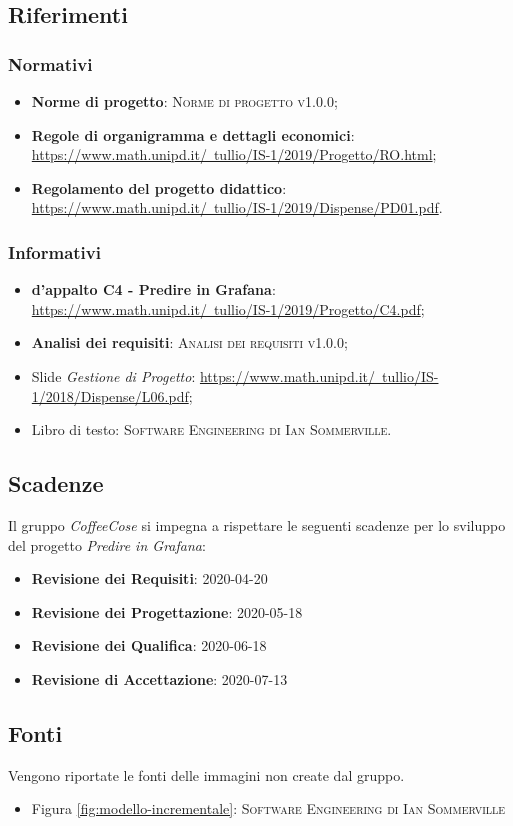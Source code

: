 \documentclass[../piano-di-progetto.tex]{subfiles}
\begin{document}
\subsection{Riferimenti}
\subsubsection{Normativi}
\begin{itemize}
  \item \textbf{Norme di progetto}: \textsc{Norme di progetto v1.0.0};
  \item \textbf{Regole di organigramma e dettagli economici}: \href{https://www.math.unipd.it/~tullio/IS-1/2019/Progetto/RO.html}{https://www.math.unipd.it/~tullio/IS-1/2019/Progetto/RO.html};
  \item \textbf{Regolamento del progetto didattico}: \href{https://www.math.unipd.it/~tullio/IS-1/2019/Dispense/PD01.pdf}{https://www.math.unipd.it/~tullio/IS-1/2019/Dispense/PD01.pdf}.
\end{itemize}

\subsubsection{Informativi}
\begin{itemize}
  \item \textbf{ d’appalto C4 - Predire in Grafana}: \href{https://www.math.unipd.it/~tullio/IS-1/2019/Progetto/C4.pdf}{https://www.math.unipd.it/~tullio/IS-1/2019/Progetto/C4.pdf};
  \item \textbf{Analisi dei requisiti}: \textsc{Analisi dei requisiti v1.0.0};
  \item Slide \emph{Gestione di Progetto}: \href{https://www.math.unipd.it/~tullio/IS-1/2018/Dispense/L06.pdf}{https://www.math.unipd.it/~tullio/IS-1/2018/Dispense/L06.pdf};
  \item Libro di testo: \textsc{Software Engineering di Ian Sommerville}.
\end{itemize}

\subsection{Scadenze}
\label{scadenze}
Il gruppo \emph{CoffeeCose} si impegna a rispettare le seguenti scadenze per lo sviluppo del progetto \emph{Predire in Grafana}:
\begin{itemize}
    \item \textbf{Revisione dei Requisiti}: 2020-04-20
    \item \textbf{Revisione dei Progettazione}: 2020-05-18
    \item \textbf{Revisione dei Qualifica}: 2020-06-18
    \item \textbf{Revisione di Accettazione}: 2020-07-13
\end{itemize}

\subsection{Fonti}
Vengono riportate le fonti delle immagini non create dal gruppo.
\begin{itemize}
    \item Figura \ref{fig:modello-incrementale}: \textsc{Software Engineering di Ian Sommerville}
\end{itemize}
\end{document}
